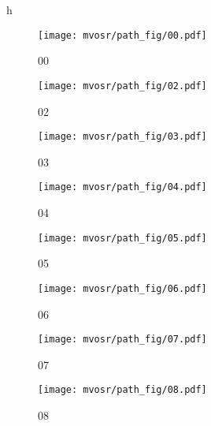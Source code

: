 \begin{figure*}{h}
    \centering
    \begin{subfigure}[c]{0.22\textwidth}
        \texttt{[image: mvosr/path\_fig/00.pdf]}
        \caption{00}
        \vspace*{2mm}
        \label{fig:orb_noLC_path_00}
    \end{subfigure}
    \begin{subfigure}[c]{0.22\textwidth}
        \texttt{[image: mvosr/path\_fig/02.pdf]}
        \caption{02}
        \label{fig:orb_noLC_path_02}
        \vspace*{2mm}
    \end{subfigure}
    \begin{subfigure}[c]{0.22\textwidth}
            \texttt{[image: mvosr/path\_fig/03.pdf]}
        \caption{03}
        \label{fig:orb_noLC_path_03}
        \vspace*{2mm}
    \end{subfigure}
    \begin{subfigure}[c]{0.22\textwidth}
        \texttt{[image: mvosr/path\_fig/04.pdf]}
        \caption{04}
        \label{fig:orb_noLC_path_04}
        \vspace*{2mm}
    \end{subfigure}
    \begin{subfigure}[c]{0.22\textwidth}
        \texttt{[image: mvosr/path\_fig/05.pdf]}
        \caption{05}
        \label{fig:orb_noLC_path_05}
        \vspace*{2mm}
    \end{subfigure}
    \begin{subfigure}[c]{0.22\textwidth}
        \texttt{[image: mvosr/path\_fig/06.pdf]}
        \caption{06}
        \label{fig:orb_noLC_path_06}
        \vspace*{2mm}
        \end{subfigure}
    \begin{subfigure}[c]{0.22\textwidth}
        \texttt{[image: mvosr/path\_fig/07.pdf]}
        \caption{07}
        \label{fig:orb_noLC_path_07}
        \vspace*{2mm}
    \end{subfigure}
    \begin{subfigure}[c]{0.22\textwidth}
        \texttt{[image: mvosr/path\_fig/08.pdf]}
        \caption{08}
        \label{fig:orb_noLC_path_08}
        \vspace*{2mm}

\end{subfigure}
\end{figure*}
